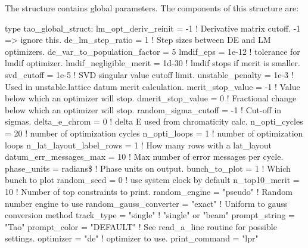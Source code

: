 {{{{{{{{
The  structure contains \tao global parameters. The components of this structure are:
\begin{example}
type tao_global_struct:
  lm_opt_deriv_reinit = -1         ! Derivative matrix cutoff. -1 => ignore this.
  de_lm_step_ratio = 1             ! Step sizes between DE and LM optimizers.
  de_var_to_population_factor = 5 
  lmdif_eps = 1e-12                ! tolerance for lmdif optimizer.
  lmdif_negligible_merit = 1d-30   ! lmdif stops if merit is smaller.
  svd_cutoff = 1e-5                ! SVD singular value cutoff limit.
  unstable_penalty = 1e-3          ! Used in unstable.lattice datum merit calculation.
  merit_stop_value = -1            ! Value below which an optimizer will stop.
  dmerit_stop_value = 0            ! Fractional change below which an optimizer will stop.
  random_sigma_cutoff = -1         ! Cut-off in sigmas.
  delta_e_chrom = 0                ! delta E used from chromaticity calc.
  n_opti_cycles = 20               ! number of optimization cycles
  n_opti_loops = 1                 ! number of optimization loops
  n_lat_layout_label_rows = 1      ! How many rows with a lat_layout
  datum_err_messages_max = 10      ! Max number of error messages per cycle.
  phase_units = radians\$           ! Phase units on output.
  bunch_to_plot = 1                ! Which bunch to plot
  random_seed = 0                  ! use system clock by default
  n_top10_merit = 10               ! Number of top constraints to print.
  random_engine = "pseudo"         ! Random number engine to use
  random_gauss_converter = "exact" ! Uniform to gauss conversion method
  track_type = "single"            ! "single" or "beam" 
  prompt_string = "Tao"
  prompt_color = "DEFAULT"         ! See read_a_line routine for possible settings.
  optimizer     = "de"             ! optimizer to use.
  print_command = "lpr"

\end{example}}}}}}}}}
